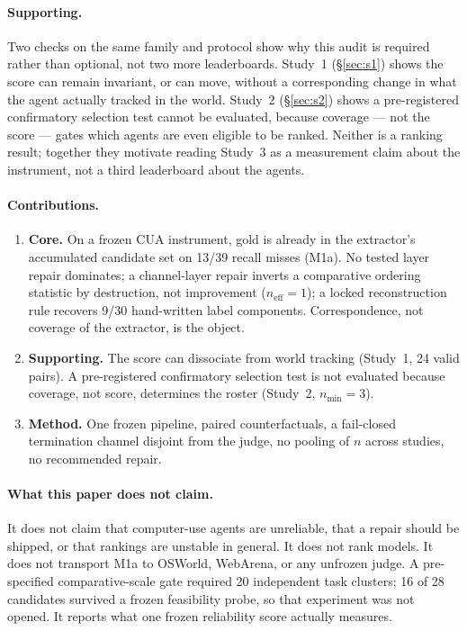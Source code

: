 \documentclass[sigconf,anonymous]{aamas}
\begin{document}
\paragraph{Supporting.}
Two checks on the same family and protocol show why this audit is required rather than optional, not two more leaderboards.
Study~1 (\S\ref{sec:s1}) shows the score can remain invariant, or can move, without a corresponding change in what the agent actually tracked in the world.
Study~2 (\S\ref{sec:s2}) shows a pre-registered confirmatory selection test cannot be evaluated, because coverage --- not the score --- gates which agents are even eligible to be ranked.
Neither is a ranking result; together they motivate reading Study~3 as a measurement claim about the instrument, not a third leaderboard about the agents.

\paragraph{Contributions.}
\begin{enumerate}[leftmargin=*,itemsep=2pt,topsep=4pt]
\item \textbf{Core.} On a frozen CUA instrument, gold is already in the extractor's accumulated candidate set on 13/39 recall misses (M1a). No tested layer repair dominates; a channel-layer repair inverts a comparative ordering statistic by destruction, not improvement ($n_{\mathrm{eff}}=1$); a locked reconstruction rule recovers 9/30 hand-written label components. Correspondence, not coverage of the extractor, is the object.
\item \textbf{Supporting.} The score can dissociate from world tracking (Study~1, 24 valid pairs). A pre-registered confirmatory selection test is not evaluated because coverage, not score, determines the roster (Study~2, $n_{\min}=3$).
\item \textbf{Method.} One frozen pipeline, paired counterfactuals, a fail-closed termination channel disjoint from the judge, no pooling of $n$ across studies, no recommended repair.
\end{enumerate}

\paragraph{What this paper does not claim.}
It does not claim that computer-use agents are unreliable, that a repair should be shipped, or that rankings are unstable in general.
It does not rank models.
It does not transport M1a to OSWorld, WebArena, or any unfrozen judge.
A pre-specified comparative-scale gate required 20 independent task clusters; 16 of 28 candidates survived a frozen feasibility probe, so that experiment was not opened.
It reports what one frozen reliability score actually measures.
\end{document}
